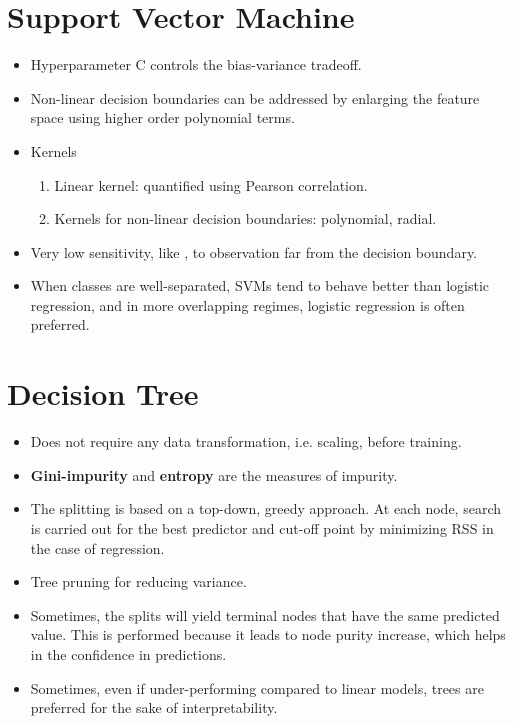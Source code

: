 \documentclass[a4paper, 12pt]{report}
\begin{document}
\section{Support Vector Machine}
\label{sec:svm}
\begin{itemize}
\item Hyperparameter C controls the bias-variance tradeoff.
\item Non-linear decision boundaries can be addressed by enlarging the feature space using higher order polynomial terms.
\item Kernels
\begin{enumerate}
\item Linear kernel: quantified using Pearson correlation.
\item Kernels for non-linear decision boundaries: polynomial, radial.
\end{enumerate}
\item Very low sensitivity, like , to observation far from the decision boundary.
\item When classes are well-separated, SVMs tend to behave better than logistic regression, and in more overlapping regimes, logistic regression is often preferred.
\end{itemize}

\section{Decision Tree}
\begin{itemize}
\item Does not require any data transformation, i.e. scaling, before training.
\item \textbf{Gini-impurity} and \textbf{entropy} are the measures of impurity.
\item The splitting is based on a top-down, greedy approach. At each node, search is carried out for the best predictor and cut-off point by minimizing RSS in the case of regression.
\item Tree pruning for reducing variance.
\item Sometimes, the splits will yield terminal nodes that have the same predicted value. This is performed because it leads to node purity increase, which helps in the confidence in predictions.
\item Sometimes, even if under-performing compared to linear models, trees are preferred for the sake of interpretability.
\end{itemize}
\end{document}
